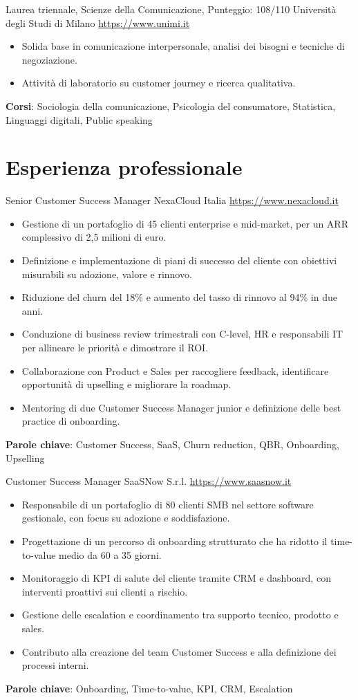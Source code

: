 \documentclass[a4paper, serif, 10pt]{moderncv}
\begin{document}
        {Laurea triennale, Scienze della Comunicazione, Punteggio: 108/110}
        {Università degli Studi di Milano}
        {\url{https://www.unimi.it}}
        {}
        {\begin{itemize}
\item Solida base in comunicazione interpersonale, analisi dei bisogni e tecniche di negoziazione.
\item Attività di laboratorio su customer journey e ricerca qualitativa.
\end{itemize}
\textbf{Corsi}: Sociologia della comunicazione, Psicologia del consumatore, Statistica, Linguaggi digitali, Public speaking}
\section{Esperienza professionale}

        {Senior Customer Success Manager}
        {NexaCloud Italia}
        {\url{https://www.nexacloud.it}}
        {}
        {\begin{itemize}
\item Gestione di un portafoglio di 45 clienti enterprise e mid-market, per un ARR complessivo di 2,5 milioni di euro.
\item Definizione e implementazione di piani di successo del cliente con obiettivi misurabili su adozione, valore e rinnovo.
\item Riduzione del churn del 18\% e aumento del tasso di rinnovo al 94\% in due anni.
\item Conduzione di business review trimestrali con C-level, HR e responsabili IT per allineare le priorità e dimostrare il ROI.
\item Collaborazione con Product e Sales per raccogliere feedback, identificare opportunità di upselling e migliorare la roadmap.
\item Mentoring di due Customer Success Manager junior e definizione delle best practice di onboarding.
\end{itemize}
\textbf{Parole chiave}: Customer Success, SaaS, Churn reduction, QBR, Onboarding, Upselling}

        {Customer Success Manager}
        {SaaSNow S.r.l.}
        {\url{https://www.saasnow.it}}
        {}
        {\begin{itemize}
\item Responsabile di un portafoglio di 80 clienti SMB nel settore software gestionale, con focus su adozione e soddisfazione.
\item Progettazione di un percorso di onboarding strutturato che ha ridotto il time-to-value medio da 60 a 35 giorni.
\item Monitoraggio di KPI di salute del cliente tramite CRM e dashboard, con interventi proattivi sui clienti a rischio.
\item Gestione delle escalation e coordinamento tra supporto tecnico, prodotto e sales.
\item Contributo alla creazione del team Customer Success e alla definizione dei processi interni.
\end{itemize}
\textbf{Parole chiave}: Onboarding, Time-to-value, KPI, CRM, Escalation}
\end{document}
